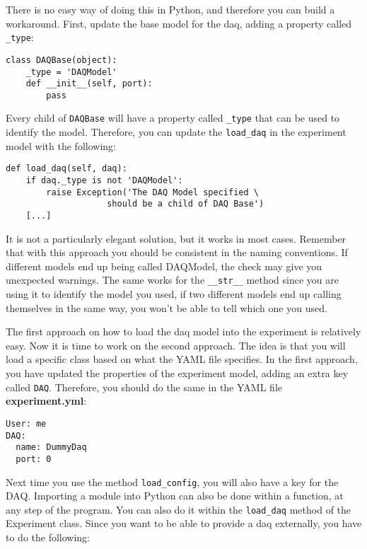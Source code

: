 {There is no easy way of doing this in Python, and therefore you can build a workaround.
First, update the base model for the daq, adding a property called
\texttt{_type}:

\begin{verbatim}
class DAQBase(object):
    _type = 'DAQModel'
    def __init__(self, port):
        pass
\end{verbatim}

Every child of \texttt{DAQBase} will have a property called
\texttt{_type} that can be used to identify the model. Therefore, you
can update the \texttt{load_daq} in the experiment model with
the following:

\begin{verbatim}
def load_daq(self, daq):
    if daq._type is not 'DAQModel':
        raise Exception('The DAQ Model specified \
                    should be a child of DAQ Base')
    [...]
\end{verbatim}

It is not a particularly elegant solution, but it works in most cases.
Remember that with this approach you should be consistent in the naming
conventions. If different models end up being called DAQModel, the check
may give you unexpected warnings. The same works for the
\texttt{__str__} method since you are using it to identify the
model you used, if two different models end up calling themselves in the
same way, you won't be able to tell which one you used.

The first approach on how to load the daq model into the experiment is
relatively easy. Now it is time to work on the second approach. The idea
is that you will load a specific class based on what the {YAML} file
specifies. In the first approach, you have updated the properties of the
experiment model, adding an extra key called \texttt{DAQ}. Therefore,
you should do the same in the {YAML} file \textbf{experiment.yml}:

\begin{verbatim}
User: me
DAQ:
  name: DummyDaq
  port: 0
\end{verbatim}

Next time you use the method \texttt{load_config}, you will also have a
key for the {DAQ}. Importing a module into Python can also be done
within a function, at any step of the program. You can also do it within
the \texttt{load_daq} method of the Experiment class. Since you want to
be able to provide a daq externally, you have to do the following:

}
